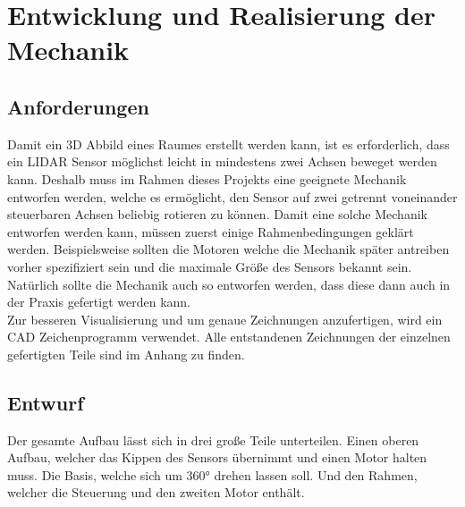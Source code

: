 \chapter{Entwicklung und Realisierung der Mechanik}\label{chap:mechanik}

\section{Anforderungen}
Damit ein \acs{3D} Abbild eines Raumes erstellt werden kann, ist es erforderlich, dass ein \ac{LIDAR} Sensor möglichst leicht in mindestens zwei Achsen beweget werden kann. Deshalb muss im Rahmen dieses Projekts eine geeignete Mechanik entworfen werden, welche es ermöglicht, den Sensor auf zwei getrennt voneinander steuerbaren Achsen beliebig rotieren zu können. Damit eine solche Mechanik entworfen werden kann, müssen zuerst einige Rahmenbedingungen geklärt werden. Beispielsweise sollten die Motoren welche die Mechanik später antreiben vorher spezifiziert sein und die maximale Größe des Sensors bekannt sein. Natürlich sollte die Mechanik auch so entworfen werden, dass diese dann auch in der Praxis gefertigt werden kann.\\
Zur besseren Visualisierung und um genaue Zeichnungen anzufertigen, wird ein \ac{CAD} Zeichenprogramm verwendet. Alle entstandenen Zeichnungen der einzelnen gefertigten Teile sind im Anhang zu finden.
\section{Entwurf}
Der gesamte Aufbau lässt sich in drei große Teile unterteilen. Einen oberen Aufbau, welcher das Kippen des Sensors übernimmt und einen Motor halten muss. Die Basis, welche sich um 360° drehen lassen soll. Und den Rahmen, welcher die Steuerung und den zweiten Motor enthält. 

